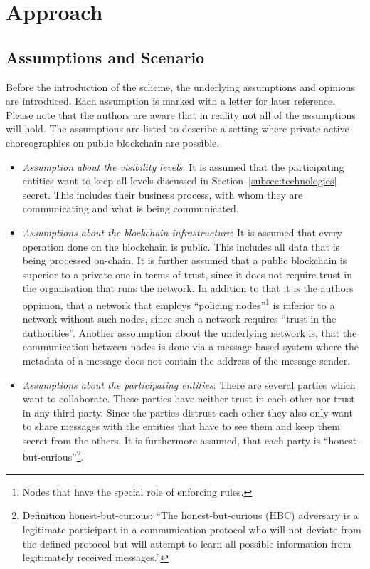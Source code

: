 \documentclass[runningheads]{llncs}
\newcommand{\refsec}[1]{Section~\ref{#1}}
\newcommand{\quotel}{``}
\newcommand{\quoter}{''}
\begin{document}
\section{Approach} \label{sec:approach}

\subsection{Assumptions and Scenario} \label{subsec:assumptions}

Before the introduction of the scheme, the underlying assumptions and opinions are introduced. Each assumption is marked with a letter for later reference. Please note that the authors are aware that in reality not all of the assumptions will hold. The assumptions are listed to describe a setting where private active choreographies on public blockchain are possible.

\begin{itemize}
    \item \textit{Assumption about the visibility levels}: It is assumed that the participating entities want to keep all levels discussed in \refsec{subsec:technologies} secret. This includes their business process, with whom they are communicating and what is being communicated. 
    \item \textit{Assumptions about the blockchain infrastructure}: It is assumed that every operation done on the blockchain is public. This includes all data that is being processed on-chain. It is further assumed that a public blockchain is superior to a private one in terms of trust, since it does not require trust in the organisation that runs the network. In addition to that it is the authors oppinion, that a network that employs \quotel  policing nodes\quoter \footnote{Nodes that have the special role of enforcing rules.} is inferior to a network without such nodes, since such a network requires \quotel trust in the authorities\quoter. Another assoumption about the underlying network is, that the communication between nodes is done via a message-based system where the metadata of a message does not contain the address of the message sender.
    \item \textit{Assumptions about the participating entities}: There are several parties which want to collaborate. These parties have neither trust in each other nor  trust in any third party. Since the parties distrust each other they also  only want to share messages with the entities that have to see them and keep them secret from the others.
    It is furthermore assumed, that each party  is  \quotel  honest-but-curious\quoter  \footnote{Definition honest-but-curious:  \quotel The honest-but-curious (HBC) adversary is a legitimate participant in a communication protocol who will not deviate from the defined protocol but will attempt to learn all possible information from legitimately received messages.\quoter  \cite{paverd2014modelling}}.
\end{itemize}
\end{document}
